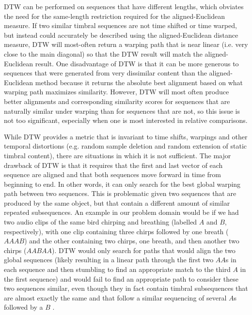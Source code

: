 \documentclass[12pt]{report} 	%
\numberwithin{figure}{chapter}
\numberwithin{table}{chapter}
\numberwithin{equation}{chapter}
\begin{document}
\begin{flushleft}
DTW can be performed on sequences that have different lengths, which obviates the need for the same-length restriction required for the aligned-Euclidean measure. If two similar timbral sequences are not time shifted or time warped, but instead could accurately be described using the aligned-Euclidean distance measure, DTW will most-often return a warping path that is near linear (i.e. very close to the main diagonal) so that the DTW result will match the aligned-Euclidean result. One disadvantage of DTW is that it can be more generous to sequences that were generated from very dissimilar content than the aligned-Euclidean method because it returns the absolute best alignment based on what warping path maximizes similarity. However, DTW will most often produce better alignments and corresponding similarity scores for sequences that are naturally similar under warping than for sequences that are not, so this issue is not too significant, especially when one is most interested in relative comparisons.

While DTW provides a metric that is invariant to time shifts, warpings and other temporal distortions (e.g. random sample deletion and random extension of static timbral content), there are situations in which it is not sufficient. The major drawback of DTW is that it requires that the first and last vector of each sequence are aligned and that both sequences move forward in time from beginning to end. In other words, it can only search for the best global warping path between two sequences. This is problematic given two sequences that are produced by the same object, but that contain a different amount of similar repeated subsequences. An example in our problem domain would be if we had two audio clips of the same bird chirping and breathing (labelled $A$ and $B$, respectively), with one clip containing three chirps followed by one breath ($AAAB$) and the other containing two chirps, one breath, and then another two chirps ($AABAA$). DTW would only search for paths that would align the two global sequences (likely resulting in a linear path through the first two $AA$s in each sequence and then stumbling to find an appropriate match to the third $A$ in the first sequence) and would fail to find an appropriate path to consider these two sequences similar, even though they in fact contain timbral subsequences that are almost exactly the same and that follow a similar sequencing of several $A$s followed by a $B$ \cite[p. 1143]{serra2008chroma}.


\end{flushleft}
\end{document}
